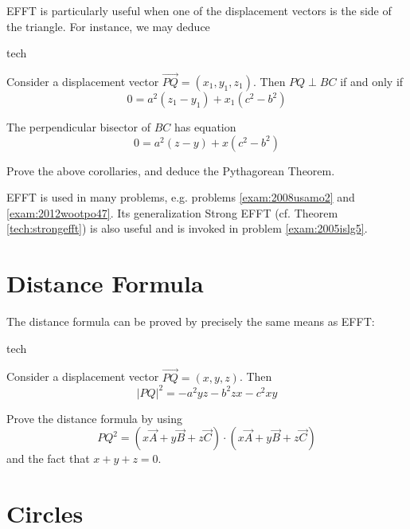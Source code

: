 EFFT is particularly useful when one of the displacement vectors is the side of the triangle.  For instance, we may deduce
\begin{StoreCode}{tech}
\begin{corollary}
  Consider a displacement vector $\overrightarrow{PQ} = (x_1,y_1,z_1)$.  Then $PQ \perp BC$ if and only if
  \[ 0 = a^2(z_1-y_1) + x_1(c^2-b^2) \]
\end{corollary}
\begin{corollary}
  \label{tech:perpbis}
  The perpendicular bisector of $BC$ has equation
  \[ 0 = a^2(z-y) + x(c^2-b^2) \]
\end{corollary}
\end{StoreCode}
\begin{exercise}
  Prove the above corollaries, and deduce the Pythagorean Theorem.
\end{exercise}

EFFT is used in many problems, e.g. problems \ref{exam:2008usamo2} and \ref{exam:2012wootpo47}.  Its generalization Strong EFFT (cf. Theorem \ref{tech:strongefft}) is also useful and is invoked in problem \ref{exam:2005islg5}.






\section{Distance Formula}
The distance formula \cite{infinity} can be proved by precisely the same means as EFFT:
\begin{StoreCode}{tech}
\begin{theorem}
  \label{tech:distance}
  Consider a displacement vector $\overrightarrow{PQ} = (x,y,z)$.  Then \[ |PQ|^2 = -a^2yz - b^2zx - c^2xy \]
\end{theorem}
\end{StoreCode}
\begin{exercise}
  Prove the distance formula by using \[ PQ^2 = (x\vec A + y\vec B + z \vec C) \cdot (x \vec A + y \vec B + z \vec C) \] and the fact that $x+y+z=0$.
\end{exercise}









\section{Circles}

